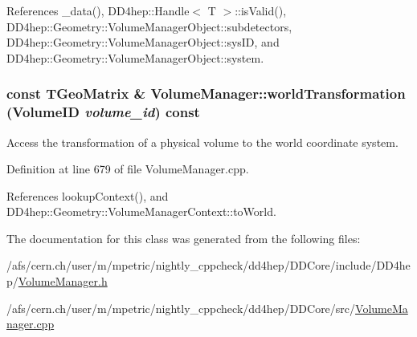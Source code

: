 References \_\-data(), DD4hep::Handle$<$ T $>$::isValid(), DD4hep::Geometry::VolumeManagerObject::subdetectors, DD4hep::Geometry::VolumeManagerObject::sysID, and DD4hep::Geometry::VolumeManagerObject::system.\hypertarget{class_d_d4hep_1_1_geometry_1_1_volume_manager_a2e00b14d61e22f8da9dc00640840b4c8}{
\subsubsection[{worldTransformation}]{\setlength{\rightskip}{0pt plus 5cm}const TGeoMatrix \& VolumeManager::worldTransformation ({\bf VolumeID} {\em volume\_\-id}) const}}
\label{class_d_d4hep_1_1_geometry_1_1_volume_manager_a2e00b14d61e22f8da9dc00640840b4c8}


Access the transformation of a physical volume to the world coordinate system. 

Definition at line 679 of file VolumeManager.cpp.

References lookupContext(), and DD4hep::Geometry::VolumeManagerContext::toWorld.

The documentation for this class was generated from the following files:\begin{DoxyCompactItemize}
\item 
/afs/cern.ch/user/m/mpetric/nightly\_\-cppcheck/dd4hep/DDCore/include/DD4hep/\hyperlink{_volume_manager_8h}{VolumeManager.h}\item 
/afs/cern.ch/user/m/mpetric/nightly\_\-cppcheck/dd4hep/DDCore/src/\hyperlink{_volume_manager_8cpp}{VolumeManager.cpp}\end{DoxyCompactItemize}
